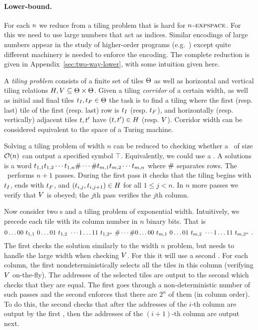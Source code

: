 \paragraph{Lower-bound.}
For each $n$ we reduce from a tiling problem that is hard for $n$-$\textsc{expspace}$.
For this we need to use large numbers that act as indices.
Similar encodings of large numbers appear in the study of higher-order programs (e.g.~\cite{J01,CW07}) except quite different machinery is needed to enforce the encoding.
The complete reduction is given in 
          {Appendix~\ref{sec:two-way-lower}},
with some intuition given here.

A \emph{tiling problem} consists of a finite set of tiles $\Theta$ as well as horizontal and vertical tiling relations 
$H, V \subseteq \Theta \times \Theta$.
Given a tiling \emph{corridor} of a certain width, as well as initial and final tiles
$t_I, t_F \in \Theta$
the task is to find a tiling where the first (resp. last) tile of the first (resp. last) row is $t_I$ (resp. $t_F$), and horizontally (resp. vertically) adjacent tiles $t, t'$ have
$\left( t, t' \right) \in H$
(resp. $V$).
Corridor width can be considered equivalent to the space of a Turing machine.

Solving a tiling problem of width $n$ can be reduced to checking whether a \FFT\ of size 
${\mathcal{O}}\mathord{\left( n \right)}$ 
can output a specified symbol $\top$.
Equivalently, we could use a \FFA.
A solutions is a word
$t_{1,1} t_{1,2} \cdots t_{1,n} \# \cdots \# t_{m,1} t_{m,2} \cdots t_{m,n}$
where $\#$ separates rows.
The \FFT\ performs $n+1$ passes.
During the first pass it checks that the tiling begins with $t_I$, ends with $t_F$, and
$\left( t_{i,j}, t_{i,j+1} \right) \in H$
for all
$1 \leq j < n$.
In $n$ more passes we verify that $V$ is obeyed; the $j$th pass verifies the $j$th column.

Now consider two \FFT{}s and a tiling problem of exponential width.
Intuitively, we precede each tile with its column number in $n$ binary bits.
That is
\[
    0\ldots00\ \tile_{1,1}\ %
    0\ldots01\ \tile_{1,2}\ %
    \cdots
    1\ldots11\ \tile_{1,2^n}\ %
    \numsep
    \cdots
    \numsep
    0\ldots00\ \tile_{m,1}\ %
    0\ldots01\ \tile_{m,2}\ %
    \cdots
    1\ldots11\ \tile_{m,2^n} \ .
\]
The first \FFT{} checks the solution similarly to the width $n$ problem, but needs to handle the large width when checking $V$.
For this it will use a second \FFT.
For each column, the first \FFT{} nondeterministically selects all the tiles in this column 
(verifying $V$ on-the-fly).
The addresses of the selected tiles are output to the second \FFT{} which checks that they are equal.
The first \FFT{} goes through a non-deterministic number of such passes and the second \FFT{} enforces that there are $2^n$ of them (in column order).
To do this, the second \FFT{} checks that after the addresses of the $i$-th column are output by the first \FFT{}, then the addresses of the $(i+1)$-th column are output next.

